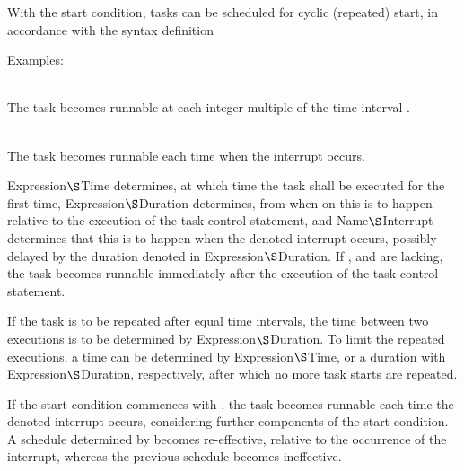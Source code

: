 With the start condition, tasks can be scheduled for cyclic (repeated)
start, in accordance with the syntax definition

\begin{grammarframe}



\end{grammarframe}

Examples:

\\
The task  becomes runnable at each integer
multiple of the time interval .

\\
The task  becomes runnable each time when the
interrupt  occurs.

  
 Expression$\S $Time determines, at which time the task shall be
executed for the first time, 
 Expression$\S $Duration determines,
from when on this is to happen relative to the execution of the task
control statement, and  
 Name$\S $Interrupt determines that this is
to happen when the denoted interrupt occurs, possibly delayed by the
duration denoted in  Expression$\S $Duration.
 If ,  and  
are lacking, the task becomes runnable immediately after the execution
of the task control statement.

If the task is to be repeated after equal time intervals, the time between
two executions is to be determined by 
 Expression$\S $Duration. 
To limit the repeated executions, a time can be determined by 
 Expression$\S $Time, or 
a duration with
  Expression$\S $Duration,
respectively, after which no more task starts are repeated.

If the start condition commences with , the task becomes runnable
each time the denoted interrupt occurs, considering further components
of the start condition. A schedule determined by  becomes
re-effective, relative to the occurrence of the interrupt, whereas the
previous schedule becomes ineffective.


